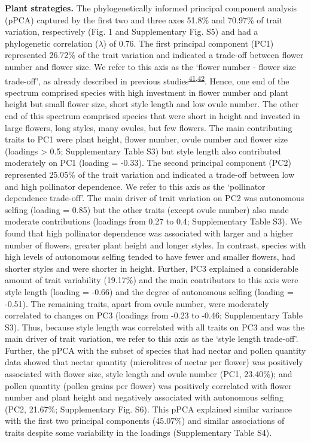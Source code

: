 \documentclass[12pt,a4paper,]{article}
\begin{document}
\textbf{Plant strategies.} The phylogenetically informed principal
component analysis (pPCA) captured by the first two and three axes
51.8\% and 70.97\% of trait variation, respectively (Fig. 1 and
Supplementary Fig. S5) and had a phylogenetic correlation (\(\lambda\))
of 0.76. The first principal component (PC1) represented 26.72\% of the
trait variation and indicated a trade-off between flower number and
flower size. We refer to this axis as the `flower number - flower size
trade-off', as already described in previous
studies\textsuperscript{\protect\hyperlink{ref-sargent2007}{41},\protect\hyperlink{ref-kettle2011}{42}}.
Hence, one end of the spectrum comprised species with high investment in
flower number and plant height but small flower size, short style length
and low ovule number. The other end of this spectrum comprised species
that were short in height and invested in large flowers, long styles,
many ovules, but few flowers. The main contributing traits to PC1 were
plant height, flower number, ovule number and flower size (loadings
\textgreater{} \textbar{}0.5\textbar{}; Supplementary Table S3) but
style length also contributed moderately on PC1 (loading = -0.33). The
second principal component (PC2) represented 25.05\% of the trait
variation and indicated a trade-off between low and high pollinator
dependence. We refer to this axis as the `pollinator dependence
trade-off'. The main driver of trait variation on PC2 was autonomous
selfing (loading = 0.85) but the other traits (except ovule number) also
made moderate contributions (loadings from 0.27 to 0.4; Supplementary
Table S3). We found that high pollinator dependence was associated with
larger and a higher number of flowers, greater plant height and longer
styles. In contrast, species with high levels of autonomous selfing
tended to have fewer and smaller flowers, had shorter styles and were
shorter in height. Further, PC3 explained a considerable amount of trait
variability (19.17\%) and the main contributors to this axis were style
length (loading = -0.66) and the degree of autonomous selfing (loading =
-0.51). The remaining traits, apart from ovule number, were moderately
correlated to changes on PC3 (loadings from -0.23 to -0.46;
Supplementary Table S3). Thus, because style length was correlated with
all traits on PC3 and was the main driver of trait variation, we refer
to this axis as the `style length trade-off'. Further, the pPCA with the
subset of species that had nectar and pollen quantity data showed that
nectar quantity (microlitres of nectar per flower) was positively
associated with flower size, style length and ovule number (PC1,
23.40\%); and pollen quantity (pollen grains per flower) was positively
correlated with flower number and plant height and negatively associated
with autonomous selfing (PC2, 21.67\%; Supplementary Fig. S6). This pPCA
explained similar variance with the first two principal components
(45.07\%) and similar associations of traits despite some variability in
the loadings (Supplementary Table S4).
\end{document}
